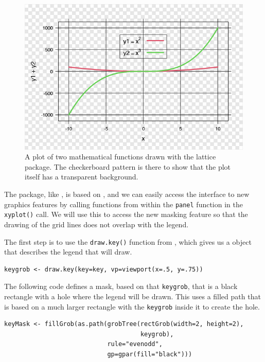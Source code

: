 \begin{figure}[h]
\includegraphics[width=1\linewidth]{murrell-definitions-2023_files/figure-latex/lattice-1} \caption{A plot of two mathematical functions drawn with the lattice package.  The checkerboard pattern is there to show that the plot itself has a transparent background.}\label{fig:lattice}
\end{figure}

The  package, like ,
is based on , and we can easily access the 
interface to new graphics features by calling  functions
from within the \texttt{panel} function in the \texttt{xyplot()} call.
We will use this to access the new masking feature so that the
drawing of the grid lines
does not overlap with the legend.

The first step is to use the \texttt{draw.key()} function from ,
which gives us a  object that describes the legend that 
will draw.

\begin{verbatim}
keygrob <- draw.key(key=key, vp=viewport(x=.5, y=.75))
\end{verbatim}

The following code defines a mask, based on that \texttt{keygrob},
that is a black rectangle with a hole
where the legend will be drawn. This uses a filled path that is
based on a much larger rectangle with the \texttt{keygrob} inside it to create
the hole.

\begin{verbatim}
keyMask <- fillGrob(as.path(grobTree(rectGrob(width=2, height=2),
                                     keygrob),
                            rule="evenodd",
                            gp=gpar(fill="black")))
\end{verbatim}

